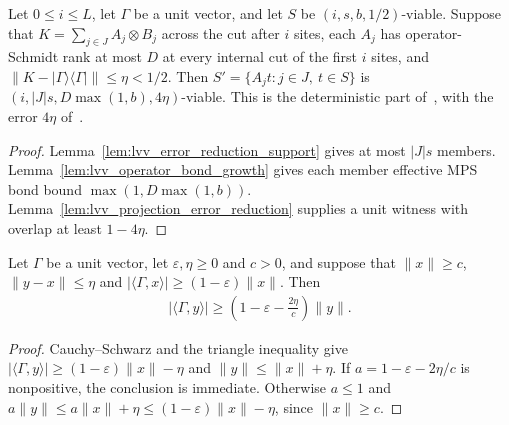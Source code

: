 \begin{lemma}
    \label{thm:lvv_mps_error_reduction}
    \leanok
    Let $0\le i\le L$, let $\Gamma$ be a unit vector, and let $S$ be
    $(i,s,b,1/2)$-viable. Suppose that
    $K=\sum_{j\in J}A_j\otimes B_j$ across the cut after $i$ sites,
    each $A_j$ has operator-Schmidt rank at most $D$ at every internal
    cut of the first $i$ sites, and
    $\|K-|\Gamma\rangle\langle\Gamma|\|\le\eta<1/2$.
    Then $S'=\{A_jt:j\in J,\ t\in S\}$ is
    $(i,|J|s,D\max(1,b),4\eta)$-viable.
    This is the deterministic part
    of~\cite[Claim~2.11, source lines 580--592]{Landau2015Polynomial}, with the
    error $4\eta$ of~\cite{gap:lvv13_error_reduction_witness_norm}.
\end{lemma}
\begin{proof}
    \leanok
    Lemma~\ref{lem:lvv_error_reduction_support} gives at most $|J|s$ members.
    Lemma~\ref{lem:lvv_operator_bond_growth} gives each member effective
    MPS bond bound $\max(1,D\max(1,b))$.
    Lemma~\ref{lem:lvv_projection_error_reduction} supplies a unit witness
    with overlap at least $1-4\eta$.
\end{proof}

\begin{lemma}
    \label{lem:lvv_overlap_perturbation}
    \leanok
    Let $\Gamma$ be a unit vector, let $\varepsilon,\eta\ge0$ and $c>0$,
    and suppose that $\|x\|\ge c$, $\|y-x\|\le\eta$ and
    $|\langle\Gamma,x\rangle|\ge(1-\varepsilon)\|x\|$. Then
    \begin{align}
        |\langle\Gamma,y\rangle|
        \ge\left(1-\varepsilon-\frac{2\eta}{c}\right)\|y\|.
        \label{eq:lvv_overlap_perturbation}
    \end{align}
\end{lemma}
\begin{proof}
    \leanok
    Cauchy--Schwarz and the triangle inequality give
    $|\langle\Gamma,y\rangle|\ge(1-\varepsilon)\|x\|-\eta$ and
    $\|y\|\le\|x\|+\eta$. If $a=1-\varepsilon-2\eta/c$ is nonpositive,
    the conclusion is immediate. Otherwise $a\le1$ and
    $a\|y\|\le a\|x\|+\eta\le(1-\varepsilon)\|x\|-\eta$,
    since $\|x\|\ge c$.
\end{proof}

